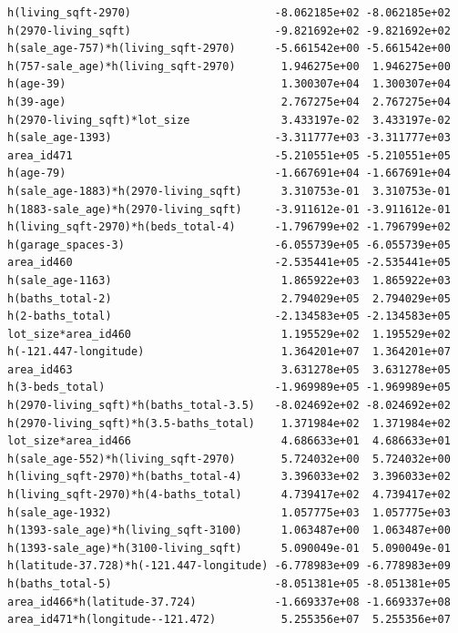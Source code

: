 \documentclass[
]{article}
\begin{document}
\begin{verbatim}
h(living_sqft-2970)                      -8.062185e+02 -8.062185e+02
h(2970-living_sqft)                      -9.821692e+02 -9.821692e+02
h(sale_age-757)*h(living_sqft-2970)      -5.661542e+00 -5.661542e+00
h(757-sale_age)*h(living_sqft-2970)       1.946275e+00  1.946275e+00
h(age-39)                                 1.300307e+04  1.300307e+04
h(39-age)                                 2.767275e+04  2.767275e+04
h(2970-living_sqft)*lot_size              3.433197e-02  3.433197e-02
h(sale_age-1393)                         -3.311777e+03 -3.311777e+03
area_id471                               -5.210551e+05 -5.210551e+05
h(age-79)                                -1.667691e+04 -1.667691e+04
h(sale_age-1883)*h(2970-living_sqft)      3.310753e-01  3.310753e-01
h(1883-sale_age)*h(2970-living_sqft)     -3.911612e-01 -3.911612e-01
h(living_sqft-2970)*h(beds_total-4)      -1.796799e+02 -1.796799e+02
h(garage_spaces-3)                       -6.055739e+05 -6.055739e+05
area_id460                               -2.535441e+05 -2.535441e+05
h(sale_age-1163)                          1.865922e+03  1.865922e+03
h(baths_total-2)                          2.794029e+05  2.794029e+05
h(2-baths_total)                         -2.134583e+05 -2.134583e+05
lot_size*area_id460                       1.195529e+02  1.195529e+02
h(-121.447-longitude)                     1.364201e+07  1.364201e+07
area_id463                                3.631278e+05  3.631278e+05
h(3-beds_total)                          -1.969989e+05 -1.969989e+05
h(2970-living_sqft)*h(baths_total-3.5)   -8.024692e+02 -8.024692e+02
h(2970-living_sqft)*h(3.5-baths_total)    1.371984e+02  1.371984e+02
lot_size*area_id466                       4.686633e+01  4.686633e+01
h(sale_age-552)*h(living_sqft-2970)       5.724032e+00  5.724032e+00
h(living_sqft-2970)*h(baths_total-4)      3.396033e+02  3.396033e+02
h(living_sqft-2970)*h(4-baths_total)      4.739417e+02  4.739417e+02
h(sale_age-1932)                          1.057775e+03  1.057775e+03
h(1393-sale_age)*h(living_sqft-3100)      1.063487e+00  1.063487e+00
h(1393-sale_age)*h(3100-living_sqft)      5.090049e-01  5.090049e-01
h(latitude-37.728)*h(-121.447-longitude) -6.778983e+09 -6.778983e+09
h(baths_total-5)                         -8.051381e+05 -8.051381e+05
area_id466*h(latitude-37.724)            -1.669337e+08 -1.669337e+08
area_id471*h(longitude--121.472)          5.255356e+07  5.255356e+07
                                                                    

\end{verbatim}
\end{document}
